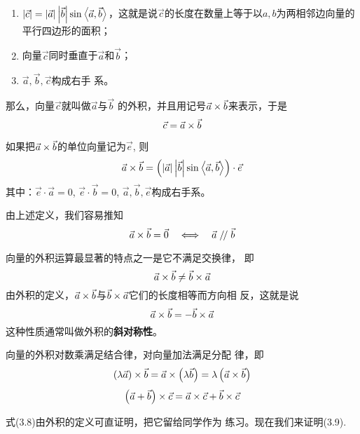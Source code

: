 \begin{enumerate}
    \item $|\vec{c}|=|\vec{a}|\left|\vec{b}\right|\sin\left\langle \vec{a},\vec{b} \right\rangle$，这就是说$\vec{c}$的长度在数量上等于以$a,b$为两相邻边向量的平行四边形的面积；
    \item 向量$\vec{c}$同时垂直于$\vec{a}$和$\vec{b}$；
    \item $\vec{a},\vec{b},\vec{c}$构成右手
    系。
\end{enumerate}

那么，向量$\vec{c}$就叫做$\vec{a}$与$\vec{b}$
的外积，并且用记号$\vec{a}\times\vec{b}$来表示，于是
\[\vec{c}=\vec{a}\times \vec{b}\]

如果把$\vec{a}\times \vec{b}$的单位向量记为$\vec{e}$, 则
\[\vec{a}\times \vec{b}=\left(|\vec{a}|\left|\vec{b}\right|\sin\left\langle \vec{a},\vec{b} \right\rangle\right)\cdot \vec{e}\]
其中：$\vec{e}\cdot \vec{a}=0$, $\vec{e}\cdot \vec{b}=0$, $\vec{a},\vec{b},\vec{e}$构成右手系。

由上述定义，我们容易推知
\[\vec{a}\times \vec{b}=\vec{0}\quad \Longleftrightarrow\quad  \vec{a}\mathrel{/\mskip-2.5mu/} \vec{b}\]

向量的外积运算最显著的特点之一是它不满足交换律，
即
\[\vec{a}\times \vec{b}\ne \vec{b}\times \vec{a}\]
由外积的定义，$\vec{a}\times \vec{b}$与$\vec{b}\times \vec{a}$它们的长度相等而方向相
反，这就是说
\begin{equation}
    \vec{a}\times \vec{b}=-\vec{b}\times \vec{a}
\end{equation}
这种性质通常叫做外积的\textbf{斜对称性}。

向量的外积对数乘满足结合律，对向量加法满足分配
律，即
\begin{equation}
    \left(\lambda\vec{a}\right)\times \vec{b}=\vec{a}\times \left(\lambda\vec{b}\right)=\lambda\left(\vec{a}\times \vec{b}\right)
\end{equation}
\begin{equation}
    \left(\vec{a}+\vec{b}\right)\times \vec{c}=\vec{a}\times \vec{c}+\vec{b}\times \vec{c}
\end{equation}

式(3.8)由外积的定义可直证明，把它留给同学作为
练习。现在我们来证明(3.9).

